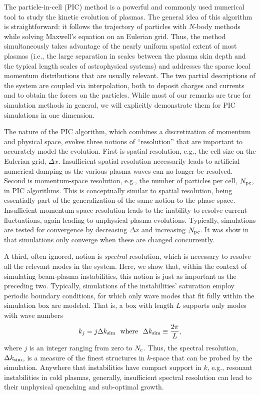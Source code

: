 \documentclass[pop,numberedappendix,iop]{aeb_emulateapj_2015}
\begin{document}
The particle-in-cell (PIC) method \citep{Hockney-Eastwood,Birdsall-Langdon} is a powerful and commonly used numerical tool to study the kinetic evolution of plasmas.
The general idea of this algorithm is straightforward: it follows the trajectory of particles with $N$-body methods while solving Maxwell's equation on an Eulerian grid.
Thus, the method simultaneously takes advantage of the nearly uniform spatial extent of most plasmas (i.e., the large separation in scales between the plasma skin depth and the typical length scales of astrophysical systems) and addresses the sparse local momentum distributions that are usually relevant.  The two partial descriptions of the system are coupled via interpolation, both to deposit charges and currents and to obtain the forces on the particles.  While most of our remarks are true for simulation methods in general, we will explicitly demonstrate them for PIC simulations in one dimension.


The nature of the PIC algorithm, which combines a discretization of momentum and physical space, evokes three notions of  ``resolution'' that are important to accurately model the evolution.
First is spatial resolution, e.g., the cell size on the Eulerian grid, $\Delta x$.
Insufficient spatial resolution necessarily leads to artificial numerical damping as the various plasma waves can no longer be resolved.
Second is momentum-space resolution, e.g., the number of particles per cell, $N_{\rm pc}$, in PIC algorithms.
This is conceptually similar to spatial resolution, being essentially part of the generalization of the same notion to the phase space.
Insufficient momentum space resolution leads to the inability to resolve current fluctuations, again leading to unphysical plasma evolutions.
Typically, simulations are tested for convergence by decreasing $\Delta x$ and increasing $N_{\rm pc}$. It was show in~\citet{sharp} that simulations only converge when these are changed concurrently.


A third, often ignored, notion is {\it spectral} resolution, which is necessary to resolve all the relevant modes in the system. 
Here, we show that, within the context of simulating beam-plasma instabilities, this notion is just as important as the preceding two.
Typically, simulations of the instabilities' saturation employ periodic boundary conditions, for which only wave modes that fit fully within the simulation box are modeled.  
That is, a box with length $L$ supports only modes with wave numbers
\begin{equation}
k_j = j \Delta k_{\rm sim}
~~\text{where}~~
\Delta k_{\rm sim} \equiv \frac{2\pi}{L},
\end{equation}
where $j$ is an integer ranging from zero to $N_{\rm c}$.  Thus, the spectral resolution, $\Delta k_{\rm sim}$, is a measure of the finest structures in $k$-space that can be probed by the simulation.  
Anywhere that instabilities have compact support in $k$, e.g., resonant instabilities in cold plasmas, generally, insufficient spectral resolution can lead to their unphysical quenching and sub-optimal growth.
\end{document}
